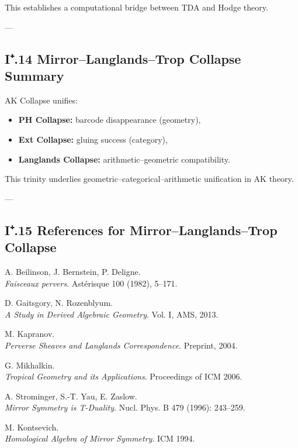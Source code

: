 \documentclass[11pt]{article}
\begin{document}
This establishes a computational bridge between TDA and Hodge theory.

---

\subsection*{I⁺.14 Mirror–Langlands–Trop Collapse Summary}

AK Collapse unifies:

\begin{itemize}
  \item \textbf{PH Collapse:} barcode disappearance (geometry),
  \item \textbf{Ext Collapse:} gluing success (category),
  \item \textbf{Langlands Collapse:} arithmetic–geometric compatibility.
\end{itemize}

This trinity underlies geometric–categorical–arithmetic unification in AK theory.

---

\subsection*{I⁺.15 References for Mirror–Langlands–Trop Collapse}

\begin{thebibliography}{9}

A. Beilinson, J. Bernstein, P. Deligne.\\
\textit{Faisceaux pervers}. Astérisque 100 (1982), 5–171.

D. Gaitsgory, N. Rozenblyum.\\
\textit{A Study in Derived Algebraic Geometry}.  
Vol. I, AMS, 2013.

M. Kapranov.\\
\textit{Perverse Sheaves and Langlands Correspondence}.  
Preprint, 2004.

G. Mikhalkin.\\
\textit{Tropical Geometry and its Applications}.  
Proceedings of ICM 2006.

A. Strominger, S.-T. Yau, E. Zaslow.\\
\textit{Mirror Symmetry is T-Duality}.  
Nucl. Phys. B 479 (1996): 243–259.

M. Kontsevich.\\
\textit{Homological Algebra of Mirror Symmetry}.  
ICM 1994.

\end{thebibliography}
\end{document}
